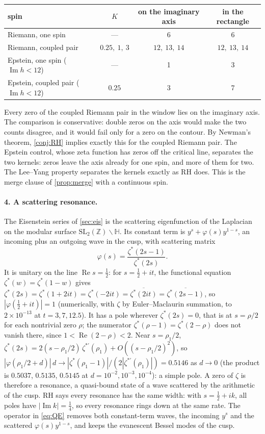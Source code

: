 \documentclass[11pt]{article}
\theoremstyle{definition}\newtheorem{definition}[theorem]{Definition}
\theoremstyle{remark}\newtheorem{remark}[theorem]{Remark}
\renewcommand{\Re}{\operatorname{Re}}\renewcommand{\Im}{\operatorname{Im}}
\begin{document}
\begin{center}\small
\begin{tabular}{@{}lccc@{}}\toprule
spin & $K$ & on the imaginary axis & in the rectangle\\\midrule
Riemann, one spin & --- & 6 & 6\\
Riemann, coupled pair & $0.25,\ 1,\ 3$ & $12,\ 13,\ 14$ & $12,\ 13,\ 14$\\
Epstein, one spin ($\Im h<12$) & --- & 1 & 3\\
Epstein, coupled pair ($\Im h<12$) & $0.25$ & 3 & 7\\\bottomrule
\end{tabular}
\end{center}
Every zero of the coupled Riemann pair in the window lies on the imaginary axis. The comparison is conservative: double zeros on the axis would make the two counts disagree, and it would fail only for a zero on the contour. By Newman's theorem, \cref{conj:RH} implies exactly this for the coupled Riemann pair. The Epstein control, whose zeta function has zeros off the critical line, separates the two kernels: zeros leave the axis already for one spin, and more of them for two. The Lee--Yang property separates the kernels exactly as RH does. This is the merge clause of \cref{prop:merge} with a continuous spin.

\paragraph{4. A scattering resonance.} The Eisenstein series of \cref{sec:eis} is the scattering eigenfunction of the Laplacian on the modular surface $\mathrm{SL}_2(\mathbb Z)\backslash\mathbb H$. Its constant term is $y^s+\varphi(s)y^{1-s}$, an incoming plus an outgoing wave in the cusp, with scattering matrix \cite{PavlovFaddeev,LaxPhillips,Gutzwiller}
\[
\varphi(s)=\frac{\zeta^*(2s-1)}{\zeta^*(2s)} .
\]
It is unitary on the line $\Re s=\frac12$: for $s=\frac12+it$, the functional equation $\zeta^*(w)=\zeta^*(1-w)$ gives $\zeta^*(2s)=\zeta^*(1+2it)=\zeta^*(-2it)=\overline{\zeta^*(2it)}=\overline{\zeta^*(2s-1)}$, so $|\varphi(\frac12+it)|=1$ (numerically, with $\zeta$ by Euler--Maclaurin summation, to $2\times10^{-13}$ at $t=3,7,12.5$). It has a pole wherever $\zeta^*(2s)=0$, that is at $s=\rho/2$ for each nontrivial zero $\rho$; the numerator $\zeta^*(\rho-1)=\zeta^*(2-\rho)$ does not vanish there, since $1<\Re(2-\rho)<2$. Near $s=\rho_1/2$, $\zeta^*(2s)=2(s-\rho_1/2)\,\zeta^{*\prime}(\rho_1)+O((s-\rho_1/2)^2)$, so $|\varphi(\rho_1/2+d)|\,d\to|\zeta^*(\rho_1-1)|/(2|\zeta^{*\prime}(\rho_1)|)=0.5146$ as $d\to0$ (the product is $0.5037$, $0.5135$, $0.5145$ at $d=10^{-2},10^{-3},10^{-4}$): a simple pole. A zero of $\zeta$ is therefore a resonance, a quasi-bound state of a wave scattered by the arithmetic of the cusp. RH says every resonance has the same width: with $s=\frac12+ik$, all poles have $|\Im k|=\frac14$, so every resonance rings down at the same rate. The operator in \eqref{eq:QE} removes both constant-term waves, the incoming $y^s$ and the scattered $\varphi(s)y^{1-s}$, and keeps the evanescent Bessel modes of the cusp.
\end{document}
